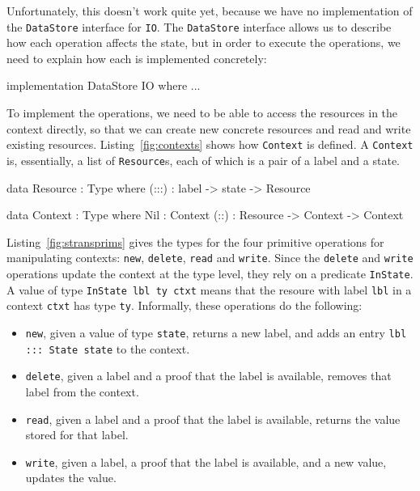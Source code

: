Unfortunately, this doesn't work quite yet, because we have no implementation
of the \texttt{DataStore} interface for \texttt{IO}.
The \texttt{DataStore} interface allows us to describe how each operation
affects the state, but in order to execute the operations, we need to
explain how each is implemented concretely:

\small
\begin{code}
implementation DataStore IO where
  ...
\end{code}
\normalsize

To implement the operations, we need to be able to access the resources in
the context directly, so that we can create new concrete resources and read
and write existing resources. Listing~\ref{fig:contexts} shows how
\texttt{Context} is defined. A \texttt{Context} is, essentially, a list of
\texttt{Resource}s, each of which is a pair of a label and a state.

\small
\begin{code}[float=h, frame=single,caption={Resources, contexts and context membership},
label=fig:contexts]
data Resource : Type where
     (:::) : label -> state -> Resource

data Context : Type where
     Nil : Context
     (::) : Resource -> Context -> Context
\end{code}
\normalsize

Listing~\ref{fig:stransprims} gives the types for the four primitive
operations for manipulating contexts: \texttt{new}, \texttt{delete},
\texttt{read} and \texttt{write}. Since the \texttt{delete} and \texttt{write}
operations update the context at the type level, they rely on a 
predicate \texttt{InState}. A value of type \texttt{InState lbl ty ctxt}
means that the resoure with label \texttt{lbl} in a context \texttt{ctxt}
has type \texttt{ty}. Informally, these operations do the following:

\begin{itemize}
\item \texttt{new}, given a value of type \texttt{state}, 
returns a new label, and adds an entry \texttt{lbl ::: State state} to
the context. 

\item \texttt{delete}, given a label and a proof that the label is available,
removes that label from the context.

\item \texttt{read}, given a label and a proof that the label is available,
returns the value stored for that label.

\item \texttt{write}, given a label, a proof that the label is available,
and a new value, updates the value.
\end{itemize}

